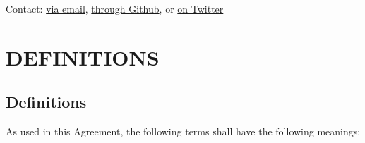 \documentclass[
]{book}
\begin{document}
Contact: \href{atlhawksfanatic@gmail.com}{via email}, \href{https://github.com/atlhawksfanatic}{through Github}, or \href{https://twitter.com/atlhawksfanatic}{on Twitter}

\hypertarget{definitions}{%
\chapter{DEFINITIONS}\label{definitions}}

\hypertarget{definitions-1}{%
\section{Definitions}\label{definitions-1}}

As used in this Agreement, the following terms shall have the following meanings:
\end{document}
